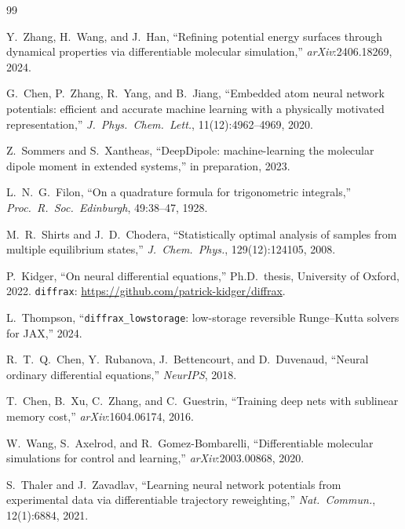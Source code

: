 \documentclass{article}
\begin{document}

\begin{thebibliography}{99}

Y.\ Zhang, H.\ Wang, and J.\ Han,
``Refining potential energy surfaces through dynamical properties via
differentiable molecular simulation,''
\textit{arXiv}:2406.18269, 2024.

G.\ Chen, P.\ Zhang, R.\ Yang, and B.\ Jiang,
``Embedded atom neural network potentials: efficient and accurate machine
learning with a physically motivated representation,''
\textit{J.\ Phys.\ Chem.\ Lett.}, 11(12):4962--4969, 2020.

Z.\ Sommers and S.\ Xantheas,
``DeepDipole: machine-learning the molecular dipole moment in extended
systems,'' in preparation, 2023.

L.\ N.\ G.\ Filon,
``On a quadrature formula for trigonometric integrals,''
\textit{Proc.\ R.\ Soc.\ Edinburgh}, 49:38--47, 1928.

M.\ R.\ Shirts and J.\ D.\ Chodera,
``Statistically optimal analysis of samples from multiple equilibrium states,''
\textit{J.\ Chem.\ Phys.}, 129(12):124105, 2008.

P.\ Kidger,
``On neural differential equations,''
Ph.D.\ thesis, University of Oxford, 2022.
\texttt{diffrax}: \url{https://github.com/patrick-kidger/diffrax}.

L.\ Thompson,
``\texttt{diffrax\_lowstorage}: low-storage reversible Runge--Kutta solvers
for JAX,'' 2024.

R.\ T.\ Q.\ Chen, Y.\ Rubanova, J.\ Bettencourt, and D.\ Duvenaud,
``Neural ordinary differential equations,''
\textit{NeurIPS}, 2018.

T.\ Chen, B.\ Xu, C.\ Zhang, and C.\ Guestrin,
``Training deep nets with sublinear memory cost,''
\textit{arXiv}:1604.06174, 2016.

W.\ Wang, S.\ Axelrod, and R.\ Gomez-Bombarelli,
``Differentiable molecular simulations for control and learning,''
\textit{arXiv}:2003.00868, 2020.

S.\ Thaler and J.\ Zavadlav,
``Learning neural network potentials from experimental data via
differentiable trajectory reweighting,''
\textit{Nat.\ Commun.}, 12(1):6884, 2021.


\end{thebibliography}
\end{document}
